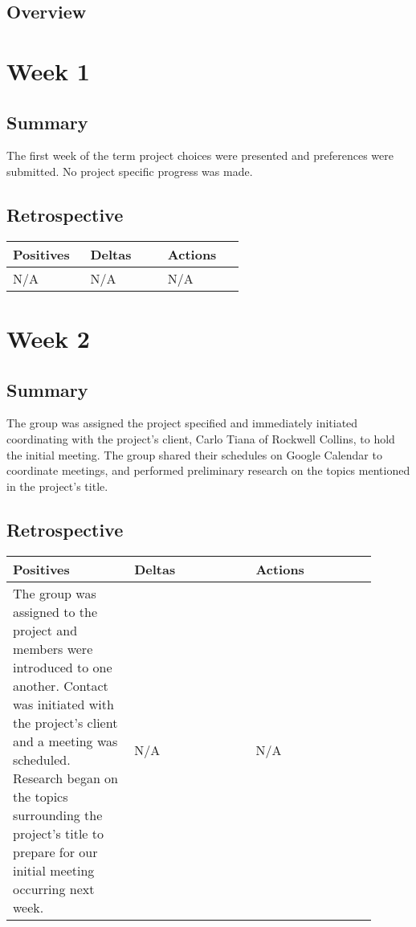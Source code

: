 \documentclass[letterpaper,10pt,serif,draftclsnofoot,onecolumn,compsoc,titlepage]{IEEEtran}
\begin{document}
\subsection{Overview}

\section{Week 1}

\subsection{Summary}

The first week of the term project choices were presented and preferences were
submitted. No project specific progress was made. 

\subsection{Retrospective}

\begin{tabular}{|p{0.3\linewidth}|p{0.3\linewidth}|p{0.3\linewidth}|}
   \hline
   \textbf{Positives} & \textbf{Deltas} & \textbf{Actions}\\ 
   \hline
   N/A 
   & N/A 
   & N/A \\
   \hline
\end{tabular}

\section{Week 2}

\subsection{Summary}

The group was assigned the project specified and immediately initiated coordinating 
with the project's client, Carlo Tiana of Rockwell Collins, to hold the initial 
meeting. The group shared their schedules on Google Calendar to coordinate meetings, 
and performed preliminary research on the topics mentioned in the project's title. 


\subsection{Retrospective}

\begin{tabular}{|p{0.3\linewidth}|p{0.3\linewidth}|p{0.3\linewidth}|}
   \hline
   \textbf{Positives} & \textbf{Deltas} & \textbf{Actions}\\ 
   \hline
   The group was assigned to the project and members were introduced to one another. 
   Contact was initiated with the project's client and a meeting was scheduled. 
   Research began on the topics surrounding the project's title to prepare 
   for our initial meeting occurring next week. 
   & 
   N/A 
   & 
   N/A \\
   \hline
\end{tabular}
\end{document}
